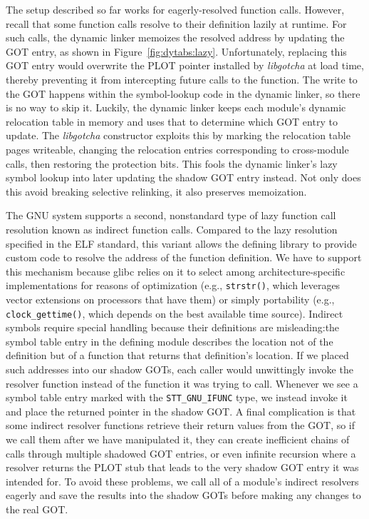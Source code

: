 The setup described so far works for eagerly-resolved function calls.  However,
recall that some function calls resolve to their definition lazily at runtime.  For
such calls, the dynamic linker memoizes the resolved address by updating the GOT
entry, as shown in Figure~\ref{fig:dytabs:lazy}.  Unfortunately, replacing this GOT
entry would overwrite the PLOT pointer installed by \textit{libgotcha} at load time,
thereby preventing it from intercepting future calls to the function.  The write to
the GOT happens within the symbol-lookup code in the dynamic linker, so there is no
way to skip it.  Luckily, the dynamic linker keeps each module's dynamic relocation
table in memory and uses that to determine which GOT entry to update.  The
\textit{libgotcha} constructor exploits this by marking the relocation table pages
writeable, changing the relocation entries corresponding to cross-module calls, then
restoring the protection bits.  This fools the dynamic linker's lazy symbol lookup
into later updating the shadow GOT entry instead.  Not only does this avoid breaking
selective relinking, it also preserves memoization.

The GNU system supports a second, nonstandard type of lazy function call resolution
known as indirect function calls.  Compared to the lazy resolution specified in the
ELF standard, this variant allows the defining library to provide custom code to
resolve the address of the function definition.  We have to support this mechanism
because glibc relies on it to select among architecture-specific implementations for
reasons of optimization (e.g., \texttt{strstr()}, which leverages vector extensions
on processors that have them) or simply portability (e.g., \texttt{clock\_gettime()},
which depends on the best available time source).  Indirect symbols require special
handling because their definitions are misleading:\@ the symbol table entry in the
defining module describes the location not of the definition but of a function that
returns that definition's location.  If we placed such addresses into our shadow
GOTs, each caller would unwittingly invoke the resolver function instead of the
function it was trying to call.  Whenever we see a symbol table entry marked with the
\texttt{STT\_GNU\_IFUNC} type, we instead invoke it and place the returned pointer in
the shadow GOT.  A final complication is that some indirect resolver functions
retrieve their return values from the GOT, so if we call them after we have
manipulated it, they can create inefficient chains of calls through multiple shadowed
GOT entries, or even infinite recursion where a resolver returns the PLOT stub that
leads to the very shadow GOT entry it was intended for.  To avoid these problems, we
call all of a module's indirect resolvers eagerly and save the results into the
shadow GOTs before making any changes to the real GOT.


